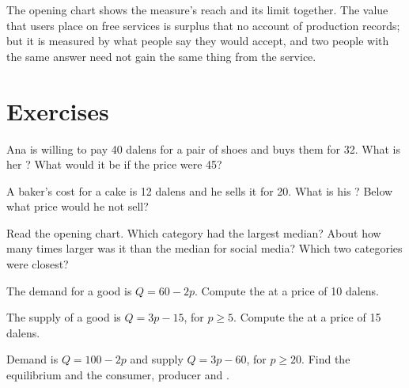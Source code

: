 The opening chart shows the measure's reach and its limit together. The value that users place on free services is surplus that no account of
production records; but it is measured by what people say they would accept, and two people with the same answer need not gain the same thing from the
service.

\section{Exercises}

\begin{exercise}[$\star$]\label{exo:g10:surplus-and-efficiency:1}
Ana is willing to pay 40 dalens for a pair of shoes and buys them for 32. What is her ? What would it be if the price were 45?
\end{exercise}

\begin{exercise}[$\star$]\label{exo:g10:surplus-and-efficiency:2}
A baker's cost for a cake is 12 dalens and he sells it for 20. What is his ? Below what price would he not sell?
\end{exercise}

\begin{exercise}[$\star$]\label{exo:g10:surplus-and-efficiency:3}
Read the opening chart. Which category had the largest median? About how many times larger was it than the median for social media? Which two
categories were closest?
\end{exercise}

\begin{exercise}[$\star$]\label{exo:g10:surplus-and-efficiency:4}
The demand for a good is $Q = 60 - 2p$. Compute the  at a price of 10 dalens.
\end{exercise}

\begin{exercise}[$\star$]\label{exo:g10:surplus-and-efficiency:5}
The supply of a good is $Q = 3p - 15$, for $p \ge 5$. Compute the  at a price of 15 dalens.
\end{exercise}

\begin{exercise}[$\star\star$]\label{exo:g10:surplus-and-efficiency:6}
Demand is $Q = 100 - 2p$ and supply $Q = 3p - 60$, for $p \ge 20$. Find the equilibrium and the consumer, producer and .
\end{exercise}

